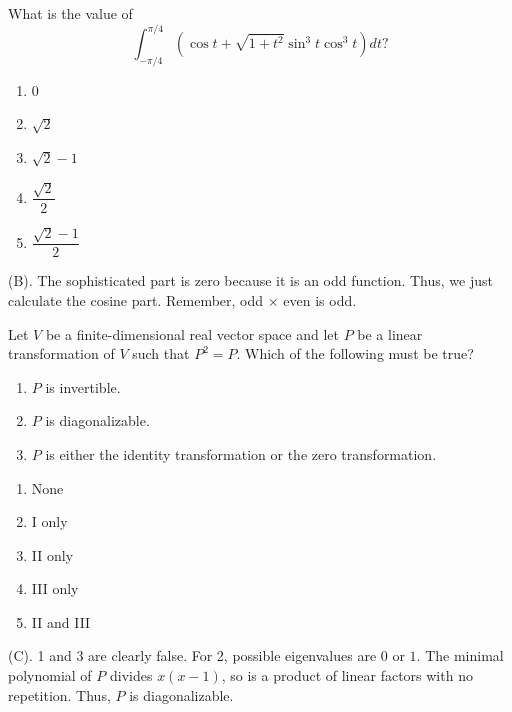 \begin{exercise}
What is the value of
\[
\int_{-\pi/4}^{\pi/4}
\left(
\cos t+\sqrt{1+t^2}\sin^3 t\cos^3 t
\right) dt?
\]

\begin{enumerate}[label=(\Alph*)]
    \item $0$
    \item $\sqrt{2}$
    \item $\sqrt{2}-1$
    \item $\dfrac{\sqrt{2}}{2}$
    \item $\dfrac{\sqrt{2}-1}{2}$
\end{enumerate}
\end{exercise}
\begin{solution}
(B). The sophisticated part is zero because it is an odd function.
Thus, we just calculate the cosine part. Remember, odd $\times$ even is odd.
\end{solution}

\begin{exercise}
Let $V$ be a finite-dimensional real vector space and let $P$ be a linear transformation of $V$ such that $P^2=P$. Which of the following must be true?

\begin{enumerate}[label=(\Alph*)]
    \item $P$ is invertible.
    \item $P$ is diagonalizable.
    \item $P$ is either the identity transformation or the zero transformation.
\end{enumerate}
\begin{enumerate}[label=(\Alph*)]
    \item None
    \item I only
    \item II only
    \item III only
    \item II and III
\end{enumerate}
\end{exercise}
\begin{solution}
(C). 1 and 3 are clearly false. For 2, possible eigenvalues are $0$ or $1$. The minimal
polynomial of $P$ divides $x(x-1)$, so is a product of linear factors with no repetition. Thus, 
$P$ is diagonalizable.
\end{solution}

